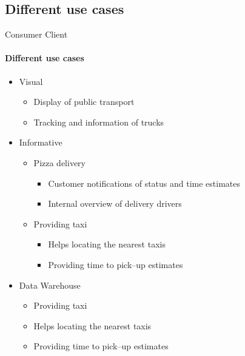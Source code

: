 \subsection{Different use cases}

\begin{frame}{Consumer Client}
    \framesubtitle{Different use cases}
    \begin{itemize}
        \item<1-> Visual
        \begin{itemize}
            \item Display of public transport
            \item Tracking and information of trucks
        \end{itemize}

        \item<1-> Informative
        \begin{itemize}
            \item<3-> Pizza delivery
            \begin{itemize}
                \item Customer notifications of status and time estimates
                \item Internal overview of delivery drivers
            \end{itemize}
            \item<4-> Providing taxi
            \begin{itemize}
                \item Helps locating the nearest taxis
                \item Providing time to pick--up estimates
            \end{itemize}
        \end{itemize}

        \item<1-> Data Warehouse
        \begin{itemize}
            \item<5-> Providing taxi
            \item<5-> Helps locating the nearest taxis
            \item<5-> Providing time to pick--up estimates
        \end{itemize}
    \end{itemize}




\end{frame}
